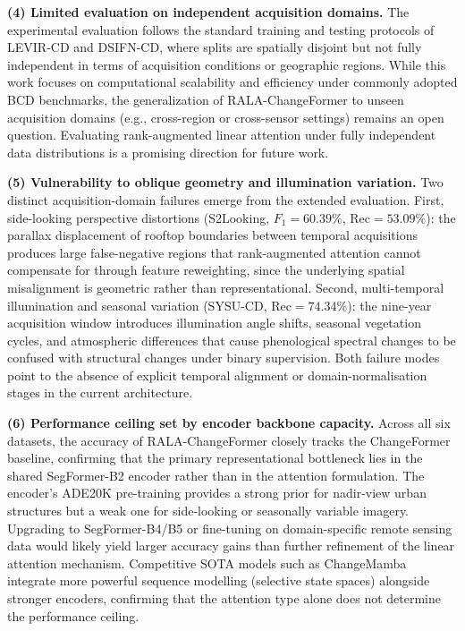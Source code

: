 \documentclass[runningheads]{llncs}
\newcommand{\journal}[1]{{\color{orange}#1}}
\begin{document}
\noindent \textbf{(4) Limited evaluation on independent acquisition domains.}
The experimental evaluation follows the standard training and testing protocols
of LEVIR-CD and DSIFN-CD, where splits are spatially disjoint but not fully
independent in terms of acquisition conditions or geographic regions. While this
work focuses on computational scalability and efficiency under commonly adopted
BCD benchmarks, the generalization of RALA-ChangeFormer to unseen acquisition
domains (e.g., cross-region or cross-sensor settings) remains an open question.
Evaluating rank-augmented linear attention under fully independent data
distributions is a promising direction for future work.

\journal{\noindent \textbf{(5) Vulnerability to oblique geometry and
illumination variation.}
Two distinct acquisition-domain failures emerge from the extended evaluation.
First, side-looking perspective distortions (S2Looking, $F_1=60.39\%$,
Rec$=53.09\%$): the parallax displacement of rooftop boundaries between
temporal acquisitions produces large false-negative regions that rank-augmented
attention cannot compensate for through feature reweighting, since the
underlying spatial misalignment is geometric rather than representational.
Second, multi-temporal illumination and seasonal variation (SYSU-CD,
Rec$=74.34\%$): the nine-year acquisition window introduces illumination angle
shifts, seasonal vegetation cycles, and atmospheric differences that cause
phenological spectral changes to be confused with structural changes under
binary supervision. Both failure modes point to the absence of explicit temporal
alignment or domain-normalisation stages in the current architecture.}

\journal{\noindent \textbf{(6) Performance ceiling set by encoder backbone
capacity.}
Across all six datasets, the accuracy of RALA-ChangeFormer closely tracks the
ChangeFormer baseline, confirming that the primary representational bottleneck
lies in the shared SegFormer-B2 encoder rather than in the attention
formulation. The encoder's ADE20K pre-training provides a strong prior for
nadir-view urban structures but a weak one for side-looking or seasonally
variable imagery. Upgrading to SegFormer-B4/B5 or fine-tuning on
domain-specific remote sensing data would likely yield larger accuracy gains
than further refinement of the linear attention mechanism.
Competitive SOTA models such as ChangeMamba~\cite{Chen2024ChangeMamba}
integrate more powerful sequence modelling (selective state spaces) alongside
stronger encoders, confirming that the attention type alone does not determine
the performance ceiling.}
\end{document}
